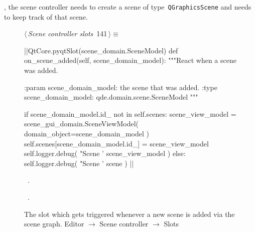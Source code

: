 \documentclass[%
    a4paper,    %
    justified,  %
    nobib,      %
    openany     %
]{tufte-book}
\makeatletter
\renewcommand{\label}[1]{\@tufte@label{##1}}%
\makeatother
\begin{document}
, the scene controller needs to
create a scene of type~\verb=QGraphicsScene= and needs to keep track of that
scene.

\begin{figure}[!htbp]
\begin{flushleft} \small
\begin{minipage}{\linewidth}\label{scrap92}\raggedright\small
{} $\langle\,${\itshape Scene controller slots}\nobreak\ {\footnotesize {141}}$\,\rangle\equiv$
\vspace{-1ex}
\begin{pythoncode}
|\normalfont{}\fontfamily{}|QtCore.pyqtSlot(scene_domain.SceneModel)
def on_scene_added(self, scene_domain_model):
    """React when a scene was added.

    :param scene_domain_model: the scene that was added.
    :type scene_domain_model:  qde.domain.scene.SceneModel
    """

    if scene_domain_model.id_ not in self.scenes:
        scene_view_model = scene_gui_domain.SceneViewModel(
            domain_object=scene_domain_model
        )
        self.scenes[scene_domain_model.id_] = scene_view_model
        self.logger.debug(
            "Scene '%
            scene_view_model
        )
    else:
        self.logger.debug(
            "Scene '%
            scene
        )
|\NWsep|
\end{pythoncode}
\vspace{1.5ex}
\footnotesize
\begin{list}{}{\setlength{\itemsep}{-\parsep}\setlength{\itemindent}{-\leftmargin}}
\item \NWtxtMacroDefBy\ .
\item \NWtxtMacroRefIn\ .

\item{}
\end{list}
\end{minipage}\vspace{4ex}
\end{flushleft}
\caption{The slot which gets triggered whenever a new scene is added via the
  scene graph.
  \newline{}\newline{}Editor $\rightarrow$ Scene controller $\rightarrow$
  Slots}
\end{figure}
\end{document}
